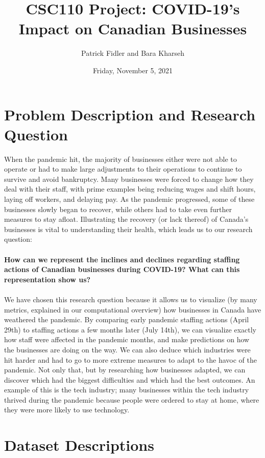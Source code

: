 \documentclass[fontsize=11pt]{article}
\title{CSC110 Project: COVID-19's Impact on Canadian Businesses}
\author{Patrick Fidler and Bara Kharseh}
\date{Friday, November 5, 2021}
\begin{document}
    \maketitle

    \section*{Problem Description and Research Question}

    When the pandemic hit, the majority of businesses either were not able to operate or had to make large adjustments to their operations to continue to survive and avoid bankruptcy. Many businesses were forced to change how they deal with their staff, with prime examples being reducing wages and shift hours, laying off workers, and delaying pay. As the pandemic progressed, some of these businesses slowly began to recover, while others had to take even further measures to stay afloat. Illustrating the recovery (or lack thereof) of Canada's businesses is vital to understanding their health, which leads us to our research question:
    \\
    \\
    \textbf{How can we represent the inclines and declines regarding staffing actions of Canadian businesses during COVID-19? What can this representation show us?}
    \\
    \\
    We have chosen this research question because it allows us to visualize (by many metrics, explained in our computational overview) how businesses in Canada have weathered the pandemic. By comparing early pandemic staffing actions (April 29th) to staffing actions a few months later (July 14th), we can visualize exactly how staff were affected in the pandemic months, and make predictions on how the businesses are doing on the way. We can also deduce which industries were hit harder and had to go to more extreme measures to adapt to the havoc of the pandemic. Not only that, but by researching how businesses adapted, we can discover which had the biggest difficulties and which had the best outcomes. An example of this is the tech industry; many businesses within the tech industry thrived during the pandemic because people were ordered to stay at home, where they were more likely to use technology.

    \section*{Dataset Descriptions}
\end{document}

